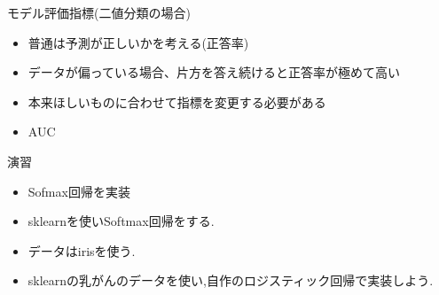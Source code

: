\begin{frame}{モデル評価指標(二値分類の場合)}
\begin{itemize}
\item 普通は予測が正しいかを考える(正答率)
\item データが偏っている場合、片方を答え続けると正答率が極めて高い
\item 本来ほしいものに合わせて指標を変更する必要がある
  \item AUC
\end{itemize}
\end{frame}

\begin{frame}{演習}
\begin{itemize}
\item Sofmax回帰を実装
  \item sklearnを使いSoftmax回帰をする.
    \item データはirisを使う.
  \item sklearnの乳がんのデータを使い,自作のロジスティック回帰で実装しよう.
\end{itemize}
\end{frame}
